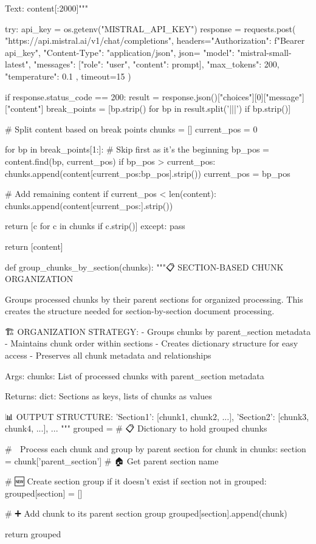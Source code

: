 Text: {content[:2000]}"""
    
    try:
        api_key = os.getenv("MISTRAL_API_KEY")
        response = requests.post(
            "https://api.mistral.ai/v1/chat/completions",
            headers={"Authorization": f"Bearer {api_key}", "Content-Type": "application/json"},
            json={
                "model": "mistral-small-latest",
                "messages": [{"role": "user", "content": prompt}],
                "max_tokens": 200,
                "temperature": 0.1
            },
            timeout=15
        )
        
        if response.status_code == 200:
            result = response.json()["choices"][0]["message"]["content"]
            break_points = [bp.strip() for bp in result.split('|||') if bp.strip()]
            
            # Split content based on break points
            chunks = []
            current_pos = 0
            
            for bp in break_points[1:]:  # Skip first as it's the beginning
                bp_pos = content.find(bp, current_pos)
                if bp_pos > current_pos:
                    chunks.append(content[current_pos:bp_pos].strip())
                    current_pos = bp_pos
            
            # Add remaining content
            if current_pos < len(content):
                chunks.append(content[current_pos:].strip())
            
            return [c for c in chunks if c.strip()]
    except:
        pass
    
    return [content]

def group_chunks_by_section(chunks):
    """📋 SECTION-BASED CHUNK ORGANIZATION
    
    Groups processed chunks by their parent sections for organized processing.
    This creates the structure needed for section-by-section document processing.
    
    🏗️ ORGANIZATION STRATEGY:
    - Groups chunks by parent_section metadata
    - Maintains chunk order within sections
    - Creates dictionary structure for easy access
    - Preserves all chunk metadata and relationships
    
    Args:
        chunks: List of processed chunks with parent_section metadata
        
    Returns:
        dict: Sections as keys, lists of chunks as values
        
    📊 OUTPUT STRUCTURE:
    {
        'Section1': [chunk1, chunk2, ...],
        'Section2': [chunk3, chunk4, ...],
        ...
    }
    """
    grouped = {}  # 📋 Dictionary to hold grouped chunks
    
    # 🔄 Process each chunk and group by parent section
    for chunk in chunks:
        section = chunk['parent_section']  # 🏠 Get parent section name
        
        # 🆕 Create section group if it doesn't exist
        if section not in grouped:
            grouped[section] = []
        
        # ➕ Add chunk to its parent section group
        grouped[section].append(chunk)
    
    return grouped